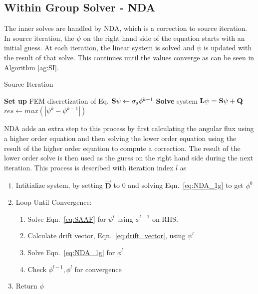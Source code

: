 \subsection{Within Group Solver - NDA}
The inner solves are handled by NDA, which is a correction to source iteration. In source iteration, the $\psi$ on the right hand side of the equation starts with an initial guess. At each iteration, the linear system is solved and $\psi$ is updated with the result of that solve. This continues until the values converge as can be seen in Algorithm \ref{ag:SI}.
\begin{algorithm}
\caption{Source Iteration}
\begin{algorithmic}
 
    \State \textbf{Set up} FEM discretization of Eq.
    \State ${\bf S} \psi \gets \sigma_s \phi^{k-1}$ 
    \State \textbf{Solve} system $\textbf{L}\psi= {\bf S}\psi + {\bf Q}$
    \State $res \gets max(|\psi^{k} - \psi^{k-1}|)$
\EndWhile
\end{algorithmic}
\label{ag:SI}
\end{algorithm}

NDA adds an extra step to this process by first calculating the angular flux using a higher order equation and then solving the lower order equation using the result of the higher order equation to compute a correction. The result of the lower order solve is then used as the guess on the right hand side during the next iteration.  This process is described with iteration index $l$ as
%
\begin{enumerate}
    \item Intitialize system, by setting $\vec{\textbf{D}}$ to 0 and solving Eqn.~\eqref{eq:NDA_1g} to get $\phi^0$ 
    \item Loop Until Convergence:
        \begin{enumerate}
            \item Solve Eqn.~\eqref{eq:SAAF} for $\psi^l$ using $\phi^{l-1}$ on RHS.
            \item Calculate drift vector, Eqn.~\eqref{eq:drift_vector}, using $\psi^l$
            \item Solve Eqn.~\eqref{eq:NDA_1g} for $\phi^l$
            \item Check $\phi^{l-1}, \phi^l$ for convergence
        \end{enumerate}
    \item Return $\phi$
\end{enumerate}


